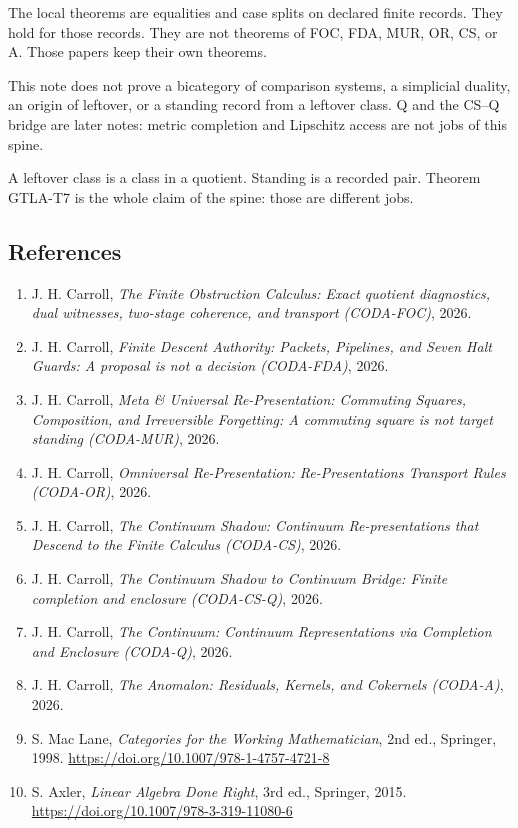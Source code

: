\documentclass[
  11pt,
]{article}
\providecommand{\tightlist}{%
  \setlength{\itemsep}{0pt}\setlength{\parskip}{0pt}}
\begin{document}
The local theorems are equalities and case splits on declared finite records. They hold for those records. They are not theorems of FOC, FDA, MUR, OR, CS, or A. Those papers keep their own theorems.

This note does not prove a bicategory of comparison systems, a simplicial duality, an origin of leftover, or a standing record from a leftover class. Q and the CS--Q bridge are later notes: metric completion and Lipschitz access are not jobs of this spine.

A leftover class is a class in a quotient. Standing is a recorded pair. Theorem GTLA-T7 is the whole claim of the spine: those are different jobs.

\subsection{References}\label{references}

\begin{enumerate}
\def\labelenumi{\arabic{enumi}.}
\tightlist
\item
  J. H. Carroll, \emph{The Finite Obstruction Calculus: Exact quotient diagnostics, dual witnesses, two-stage coherence, and transport (CODA-FOC)}, 2026.
\item
  J. H. Carroll, \emph{Finite Descent Authority: Packets, Pipelines, and Seven Halt Guards: A proposal is not a decision (CODA-FDA)}, 2026.
\item
  J. H. Carroll, \emph{Meta \& Universal Re-Presentation: Commuting Squares, Composition, and Irreversible Forgetting: A commuting square is not target standing (CODA-MUR)}, 2026.
\item
  J. H. Carroll, \emph{Omniversal Re-Presentation: Re-Presentations Transport Rules (CODA-OR)}, 2026.
\item
  J. H. Carroll, \emph{The Continuum Shadow: Continuum Re-presentations that Descend to the Finite Calculus (CODA-CS)}, 2026.
\item
  J. H. Carroll, \emph{The Continuum Shadow to Continuum Bridge: Finite completion and enclosure (CODA-CS-Q)}, 2026.
\item
  J. H. Carroll, \emph{The Continuum: Continuum Representations via Completion and Enclosure (CODA-Q)}, 2026.
\item
  J. H. Carroll, \emph{The Anomalon: Residuals, Kernels, and Cokernels (CODA-A)}, 2026.
\item
  S. Mac Lane, \emph{Categories for the Working Mathematician}, 2nd ed., Springer, 1998. \url{https://doi.org/10.1007/978-1-4757-4721-8}
\item
  S. Axler, \emph{Linear Algebra Done Right}, 3rd ed., Springer, 2015. \url{https://doi.org/10.1007/978-3-319-11080-6}
\end{enumerate}
\end{document}
